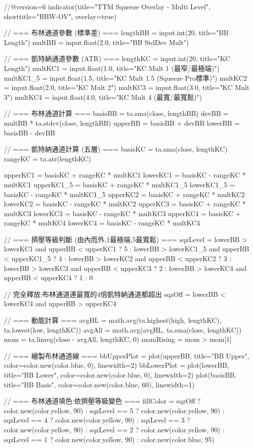 //@version=6
indicator(title="TTM Squeeze Overlay - Multi Level", shorttitle="BBW-OV", overlay=true)

// === 布林通道參數 (標準差) ===
lengthBB = input.int(20, title="BB Length")
multBB = input.float(2.0, title="BB StdDev Mult")

// === 凱特納通道參數 (ATR) ===
lengthKC = input.int(20, title="KC Length")
multKC1   = input.float(1.0, title="KC Mult 1 (最窄/最極端)")
multKC1_5 = input.float(1.5, title="KC Mult 1.5 (Squeeze Pro標準)")
multKC2   = input.float(2.0, title="KC Mult 2")
multKC3   = input.float(3.0, title="KC Mult 3")
multKC4   = input.float(4.0, title="KC Mult 4 (最寬/最寬鬆)")

// === 布林通道計算 ===
basisBB = ta.sma(close, lengthBB)
devBB = multBB * ta.stdev(close, lengthBB)
upperBB = basisBB + devBB
lowerBB = basisBB - devBB

// === 凱特納通道計算 (五層) ===
basisKC = ta.sma(close, lengthKC)
rangeKC = ta.atr(lengthKC)

upperKC1 = basisKC + rangeKC * multKC1
lowerKC1 = basisKC - rangeKC * multKC1
upperKC1_5 = basisKC + rangeKC * multKC1_5
lowerKC1_5 = basisKC - rangeKC * multKC1_5
upperKC2 = basisKC + rangeKC * multKC2
lowerKC2 = basisKC - rangeKC * multKC2
upperKC3 = basisKC + rangeKC * multKC3
lowerKC3 = basisKC - rangeKC * multKC3
upperKC4 = basisKC + rangeKC * multKC4
lowerKC4 = basisKC - rangeKC * multKC4

// === 擠壓等級判斷 (由內而外,1最極端,5最寬鬆) ===
sqzLevel = lowerBB > lowerKC1 and upperBB < upperKC1 ? 5 :
           lowerBB > lowerKC1_5 and upperBB < upperKC1_5 ? 4 :
           lowerBB > lowerKC2 and upperBB < upperKC2 ? 3 :
           lowerBB > lowerKC3 and upperBB < upperKC3 ? 2 :
           lowerBB > lowerKC4 and upperBB < upperKC4 ? 1 : 0

// 完全釋放:布林通道連最寬的4倍凱特納通道都超出
sqzOff = lowerBB < lowerKC4 and upperBB > upperKC4

// === 動能計算 ===
avgHL = math.avg(ta.highest(high, lengthKC), ta.lowest(low, lengthKC))
avgAll = math.avg(avgHL, ta.sma(close, lengthKC))
mom = ta.linreg(close - avgAll, lengthKC, 0)
momRising = mom > mom[1]

// === 繪製布林通道線 ===
bbUpperPlot = plot(upperBB, title="BB Upper", color=color.new(color.blue, 0), linewidth=2)
bbLowerPlot = plot(lowerBB, title="BB Lower", color=color.new(color.blue, 0), linewidth=2)
plot(basisBB, title="BB Basis", color=color.new(color.blue, 60), linewidth=1)

// === 布林通道填色:依擠壓等級變色 ===
fillColor = sqzOff ? color.new(color.yellow, 90) :
     sqzLevel == 5 ? color.new(color.yellow, 90) :
     sqzLevel == 4 ? color.new(color.yellow, 90) :
     sqzLevel == 3 ? color.new(color.yellow, 90) :
     sqzLevel == 2 ? color.new(color.yellow, 90) :
     sqzLevel == 1 ? color.new(color.yellow, 90) :
     color.new(color.blue, 95)

